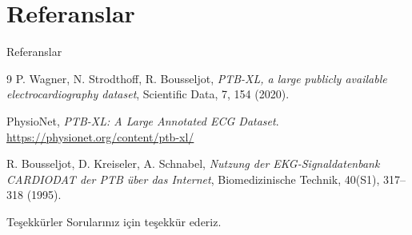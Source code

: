 \documentclass[aspectratio=169]{beamer}
\begin{document}
\section{Referanslar}

\begin{frame}{Referanslar}
	\small
	\begin{thebibliography}{9}
		P. Wagner, N. Strodthoff, R. Bousseljot, \emph{PTB-XL, a large publicly available electrocardiography dataset}, Scientific Data, 7, 154 (2020).

		PhysioNet, \emph{PTB-XL: A Large Annotated ECG Dataset}.\\
		\url{https://physionet.org/content/ptb-xl/}

		R. Bousseljot, D. Kreiseler, A. Schnabel, \emph{Nutzung der EKG-Signaldatenbank CARDIODAT der PTB über das Internet}, Biomedizinische Technik, 40(S1), 317--318 (1995).
	\end{thebibliography}
\end{frame}

\begin{frame}{Teşekkürler}
	\centering
	Sorularınız için teşekkür ederiz.
\end{frame}
\end{document}
